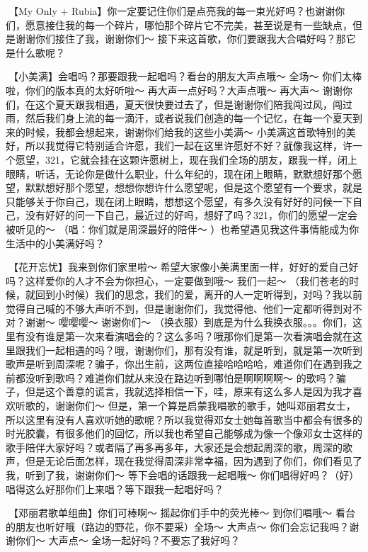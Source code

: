 \documentclass[
]{book}
\begin{document}
🎵【My Only + Rubia】你一定要记住你们是点亮我的每一束光好吗？也谢谢你们，愿意接住我的每一个碎片，哪怕那个碎片它不完美，甚至说是有一些缺点，但是谢谢你们接住了我，谢谢你们～
接下来这首歌，你们要跟我大合唱好吗？那它是什么歌呢？

🎵【小美满】会唱吗？那要跟我一起唱吗？看台的朋友大声点哦～ 全场～ 你们太棒啦，你们的版本真的太好听啦～ 再大声一点好吗？大声点哦～ 再大声～ 谢谢你们，在这个夏天跟我相遇，夏天很快要过去了，但是谢谢你们陪我闯过风，闯过雨，然后我们身上流的每一滴汗，或者说我们创造的每一个记忆，在每一个夏天到来的时候，我都会想起来，谢谢你们给我的这些小美满～ 小美满这首歌特别的美好，所以我觉得它特别适合许愿，我们一起在这里许愿好不好？就像我这样，许一个愿望，321，它就会挂在这颗许愿树上，现在我们全场的朋友，跟我一样，闭上眼睛，听话，无论你是做什么职业，什么年纪的，现在闭上眼睛，默默想好那个愿望，默默想好那个愿望，想想你想许什么愿望呢，但是这个愿望有一个要求，就是只能够关于你自己，现在闭上眼睛，想想这个愿望，有多久没有好好的问候一下自己，没有好好的问一下自己，最近过的好吗，想好了吗？321，你们的愿望一定会被听见的～ （唱：你们就是周深最好的陪伴～ ）也希望遇见我这件事情能成为你生活中的小美满好吗？

🎵【花开忘忧】我来到你们家里啦～ 希望大家像小美满里面一样，好好的爱自己好吗？这样爱你的人才不会为你担心，一定要做到哦～ 我们一起～ （我们苍老的时候，就回到小时候）我们的思念，我们的爱，离开的人一定听得到，对吗？我以前觉得自己喊的不够大声听不到，但是谢谢你们，我觉得他、他们一定都听得到对不对？谢谢～
嘤嘤嘤～ 谢谢你们～ （换衣服）到底是为什么我换衣服。。。你们，这里有没有谁是第一次来看演唱会的？这么多吗？哦那你们是第一次看演唱会就在这里跟我们一起相遇的吗？哦，谢谢你们，那有没有谁，就是听到，就是第一次听到歌声是听到周深呢？骗子，你出生前，这两位直接哈哈哈哈，难道你们在遇到我之前都没听到歌吗？难道你们就从来没在路边听到哪怕是啊啊啊啊～ 的歌吗？骗子，但是这个善意的谎言，我就选择相信一下，哇，原来有这么多人是因为我才喜欢听歌的，谢谢你们～ 但是，第一个算是启蒙我唱歌的歌手，她叫邓丽君女士，所以这里有没有人喜欢听她的歌呢？所以我觉得邓女士她每首歌当中都会有很多的时光胶囊，有很多他们的回忆，所以我也希望自己能够成为像一个像邓女士这样的歌手陪伴大家好吗？或者隔了再多再多年，大家还是会想起周深的歌，周深的歌声，但是无论后面怎样，现在我觉得周深非常幸福，因为遇到了你们，你们看见了我，听到了我，谢谢你们～ 等下会唱的话跟我一起唱哦～ 你们唱得好吗？（好）唱得这么好那你们上来唱？等下跟我一起唱好吗？

🎵【邓丽君歌单组曲】你们可棒啊～ 摇起你们手中的荧光棒～ 到你们唱哦～ 看台的朋友也听好哦（路边的野花，你不要采）全场～ 大声点～ 你们会忘记我吗？谢谢你们～ 大声点～ 全场一起好吗？不要忘了我好吗？
\end{document}
